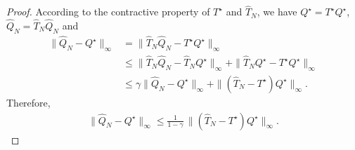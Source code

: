 \documentclass[10pt,a4paper]{amsart}
\begin{document}
\begin{proof}
According to the contractive property of $T^\star$ and $\hat{T}_N$, we have $Q^\star=T^\star Q^\star$, $\hat Q_N=\hat{T}_N\hat Q_N$ and
\begin{align*}
\|\hat Q_N-Q^\star\|_\infty
&= \|\hat{T}_N\hat Q_N - T^\star Q^\star\|_\infty \\
&\le \|\hat{T}_N\hat Q_N - \hat{T}_N Q^\star\|_\infty
    + \|\hat{T}_N Q^\star - T^\star Q^\star\|_\infty \\
&\le \gamma \|\hat Q_N-Q^\star\|_\infty + \|(\hat{T}_N-T^\star )Q^\star\|_\infty.
\end{align*}
Therefore,
\begin{align}\label{eq: Q and T}
\|\hat Q_N-Q^\star\|_\infty \le \frac{1}{1-\gamma}\,\|(\hat{T}_N-T^\star)Q^\star\|_\infty.
\end{align}


\end{proof}
\end{document}
